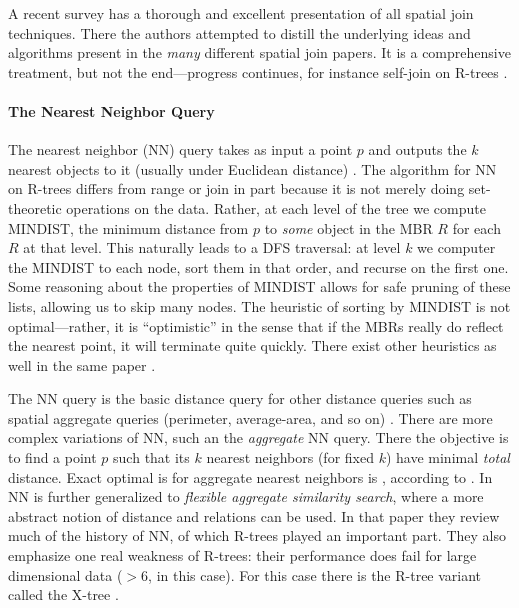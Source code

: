 A recent survey \cite{jacoxsamet07} has a thorough and excellent presentation of all spatial join techniques.
There the authors attempted to distill the underlying ideas and algorithms present in the \emph{many} different spatial join papers.
It is a comprehensive treatment, but not the end---progress continues, for instance self-join on R-trees \cite{vassilakopouloscorralkaranikolas11}.

\paragraph{The Nearest Neighbor Query}
The nearest neighbor (NN) query takes as input a point $p$ and outputs the $k$ nearest objects to it (usually under Euclidean distance) \cite{roussopouloskelleyvincent95}.
The algorithm for NN on R-trees differs from range or join in part because it is not merely doing set-theoretic operations on the data. 
Rather, at each level of the tree we compute MINDIST, the minimum distance from $p$ to \emph{some} object in the MBR $R$ for each $R$ at that level.
This naturally leads to a DFS traversal: at level $k$ we computer the MINDIST to each node, sort them in that order, and recurse on the first one.
Some reasoning about the properties of MINDIST allows for safe pruning of these lists, allowing us to skip many nodes.
The heuristic of sorting by MINDIST is not optimal---rather, it is ``optimistic'' in the sense that if the MBRs really do reflect the nearest point, it will terminate quite quickly.
There exist other heuristics as well in the same paper \cite{roussopouloskelleyvincent95}.

The NN query is the basic distance query for other distance queries such as spatial aggregate queries (perimeter, average-area, and so on) \cite{corralalmendros-jimenez07}.
There are more complex variations of NN, such an the \emph{aggregate} NN query.
There the objective is to find a point $p$ such that its $k$ nearest neighbors (for fixed $k$) have minimal \emph{total} distance.
Exact optimal is for aggregate nearest neighbors is \cite{papadiastaomouratidishui05}, according to \cite{liliyiyaowang11}.
In \cite{liliyiyaowang11} NN is further generalized to \emph{flexible aggregate similarity search}, where a more abstract notion of distance and relations can be used.
In that paper they review much of the history of NN, of which R-trees played an important part.
They also emphasize one real weakness of R-trees: their performance does fail for large dimensional data ($>6$, in this case).
For this case there is the R-tree variant called the X-tree \cite{berchtold2001x}.


